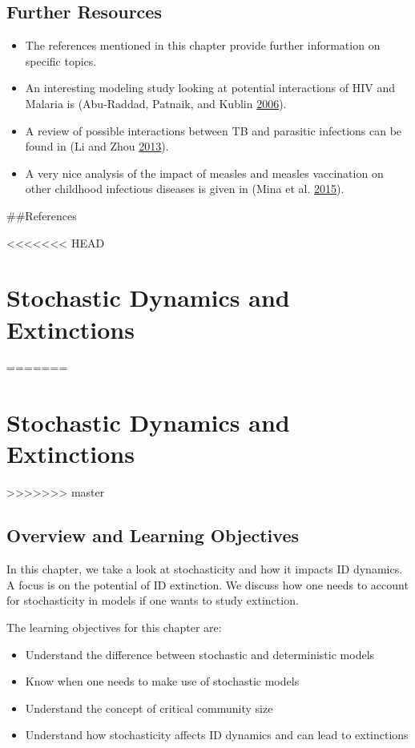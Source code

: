 \documentclass[]{book}
\providecommand{\tightlist}{%
  \setlength{\itemsep}{0pt}\setlength{\parskip}{0pt}}
\theoremstyle{definition}
\theoremstyle{definition}
\theoremstyle{definition}
\theoremstyle{remark}
\begin{document}
\hypertarget{further-resources-5}{%
\section{Further Resources}\label{further-resources-5}}

\begin{itemize}
\tightlist
\item
  The references mentioned in this chapter provide further information
  on specific topics.
\item
  An interesting modeling study looking at potential interactions of HIV
  and Malaria is (Abu-Raddad, Patnaik, and Kublin
  \protect\hyperlink{ref-abu-raddad06}{2006}).
\item
  A review of possible interactions between TB and parasitic infections
  can be found in (Li and Zhou \protect\hyperlink{ref-li13}{2013}).
\item
  A very nice analysis of the impact of measles and measles vaccination
  on other childhood infectious diseases is given in (Mina et al.
  \protect\hyperlink{ref-mina15}{2015}).
\end{itemize}

\#\#References

<<<<<<< HEAD
\hypertarget{stochastic}{%
\chapter{Stochastic Dynamics and Extinctions}\label{stochastic}}
=======
\chapter{Stochastic Dynamics and Extinctions}\label{stochastic}
>>>>>>> master

\hypertarget{overview-and-learning-objectives-11}{%
\section{Overview and Learning
Objectives}\label{overview-and-learning-objectives-11}}

In this chapter, we take a look at stochasticity and how it impacts ID
dynamics. A focus is on the potential of ID extinction. We discuss how
one needs to account for stochasticity in models if one wants to study
extinction.

The learning objectives for this chapter are:

\begin{itemize}
\tightlist
\item
  Understand the difference between stochastic and deterministic models
\item
  Know when one needs to make use of stochastic models
\item
  Understand the concept of critical community size
\item
  Understand how stochasticity affects ID dynamics and can lead to
  extinctions
\end{itemize}
\end{document}
